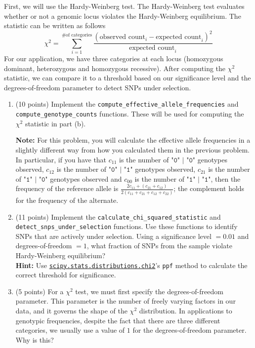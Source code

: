 First, we will use the Hardy-Weinberg test. 
The Hardy-Weinberg test evaluates whether or not a genomic locus violates the Hardy-Weinberg equilibrium. The statistic can be written as follows
$$\chi^2 = \sum_{i= 1}^{\text{\# of categories}} \frac{(\text{observed count}_i - \text{expected count}_i)^2}{\text{expected count}_i}$$
For our application, we have three categories at each locus (homozygous dominant, heterozygous and homozygous recessive). After computing the $\chi^2$ statistic, we can compare it to a threshold based on our significance level and the degrees-of-freedom parameter to detect SNPs under selection.
\begin{enumerate}
    \item (10 points) Implement the  \texttt{compute\_effective\_allele\_frequencies} and \texttt{compute\_genotype\_counts} functions. These will be used for computing the $\chi^2$ statistic in part (b).
    
    \textbf{Note:} For this problem, you will calculate the effective allele frequencies in a slightly different way from how you calculated them in the previous problem. In particular, if you have that $c_{11}$ is the number of $\texttt{"0" | "0"}$ genotypes observed, $c_{12}$ is the number of $\texttt{"0" | "1"}$ genotypes observed, $c_{21}$ is the number of $\texttt{"1" | "0"}$ genotypes observed and $c_{00}$ is the number of $\texttt{"1" | "1"}$, then the frequency of the reference allele is $\frac{2c_{11} + (c_{21} + c_{12})}{2(c_{11} + c_{21} + c_{12} + c_{22})}$; the complement holds for the frequency of the alternate.
    
    \item (11 points) Implement the \texttt{calculate\_chi\_squared\_statistic} and \texttt{detect\_snps\_under\_selection} functions. Use these functions to identify SNPs that are actively under selection. Using a significance level $=0.01$ and degrees-of-freedom $=1$, what fraction of SNPs from the sample violate Hardy-Weinberg equilibrium?\\
    
    \textbf{Hint:} Use \href{https://docs.scipy.org/doc/scipy/reference/generated/scipy.stats.chi2.html}{\texttt{scipy.stats.distributions.chi2}}'s \texttt{ppf} method to calculate the correct threshold for significance.
    \begin{solution}
    \end{solution}
    \item (5 points) For a $\chi^2$ test, we must first specify the degrees-of-freedom parameter. This parameter is the number of freely varying factors in our data, and it governs the shape of the $\chi^2$ distribution. In applications to genotypic frequencies, despite the fact that there are three different categories, we usually use a value of $1$ for the degrees-of-freedom parameter. Why is this?
    
    \begin{solution}
    
    \end{solution}
\end{enumerate}
\newpage
